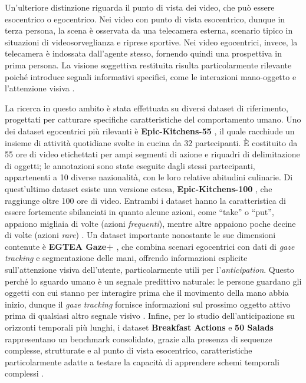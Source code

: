 Un'ulteriore distinzione riguarda il punto di vista dei video, che può essere esocentrico o egocentrico. Nei video con punto di vista esocentrico, dunque in terza persona, la scena è osservata da una telecamera esterna, scenario tipico in situazioni di videosorveglianza e riprese sportive. Nei video egocentrici, invece, la telecamera è indossata dall'agente stesso, fornendo quindi una prospettiva in prima persona. La visione soggettiva restituita risulta particolarmente rilevante poiché introduce segnali informativi specifici, come le interazioni mano-oggetto e l'attenzione visiva \cite{furnari2019would}.

La ricerca in questo ambito è stata effettuata su diversi dataset di riferimento, progettati per catturare specifiche caratteristiche del comportamento umano. Uno dei dataset egocentrici più rilevanti è \textbf{Epic-Kitchens-55} \cite{damen2018scaling}, il quale racchiude un insieme di attività quotidiane svolte in cucina da 32 partecipanti. È costituito da 55 ore di video etichettati per ampi segmenti di azione e riquadri di delimitazione di oggetti; le annotazioni sono state eseguite dagli stessi partecipanti, appartenenti a 10 diverse nazionalità, con le loro relative abitudini culinarie. Di quest'ultimo dataset esiste una versione estesa, \textbf{Epic-Kitchens-100} \cite{damen2022rescaling}, che raggiunge oltre 100 ore di video. Entrambi i dataset hanno la caratteristica di essere fortemente sbilanciati in quanto alcune azioni, come ``take'' o ``put'', appaiono migliaia di volte (azioni \textit{frequenti}), mentre altre appaiono poche decine di volte (azioni \textit{rare}) \cite{damen2022rescaling}.
Un dataset importante nonostante le sue dimensioni contenute è \textbf{EGTEA Gaze+} \cite{li2018eye}, che combina scenari egocentrici con dati di \textit{gaze tracking} e segmentazione delle mani, offrendo informazioni esplicite sull'attenzione visiva dell'utente, particolarmente utili per l'\textit{anticipation}. Questo perché lo sguardo umano è un segnale predittivo naturale: le persone guardano gli oggetti con cui stanno per interagire prima che il movimento della mano abbia inizio, dunque il \textit{gaze tracking} fornisce informazioni sul prossimo oggetto attivo prima di qualsiasi altro segnale visivo \cite{li2021eye}.
Infine, per lo studio dell'anticipazione su orizzonti temporali più lunghi, i dataset \textbf{Breakfast Actions} \cite{kuehne2014language} e \textbf{50 Salads} \cite{stein2013salads} rappresentano un benchmark consolidato, grazie alla presenza di sequenze complesse, strutturate e al punto di vista esocentrico, caratteristiche particolarmente adatte a testare la capacità di apprendere schemi temporali complessi \cite{lai2024human}. 
